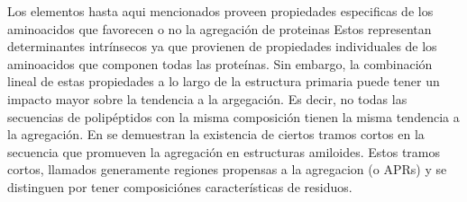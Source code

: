 

Los elementos hasta aqui mencionados proveen propiedades especificas de los aminoacidos que favorecen o no la agregación de proteinas
Estos representan determinantes intrínsecos ya que provienen de propiedades individuales de los aminoacidos que componen todas las proteínas.
Sin embargo, la combinación lineal de estas propiedades a lo largo de la estructura primaria puede tener un impacto mayor sobre la tendencia a la argegación.
Es decir, no todas las secuencias de polipéptidos con la misma composición tienen la misma tendencia a la agregación.
En \cite{ventura2004short} se demuestran la existencia de ciertos tramos cortos en la secuencia que promueven la agregación en estructuras amiloides.
Estos tramos cortos, llamados generamente regiones propensas a la agregacion (o APRs) y se distinguen por tener composiciónes características de residuos.


